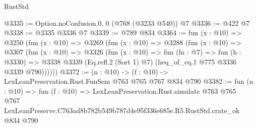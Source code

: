 \begin{lexlean}{RustStd}
\begin{coremodule}
@3335 := Option.noConfusion.{0, 0} (@768 (@3233 @540)) @7
@3336 := @422 @7
@3338 := @3335 @3336 @7
@3339 := @789 @834
@3364 := fun (x : @10) =>
  @3250
    (fun (x : @10) =>
    @3269
      (fun (x : @10) =>
      @3288
        (fun (x : @10) =>
        @3307
          (fun (x : @10) =>
          @3326
            (fun (x : @10) =>
            fun (fn : @7) =>
            fun (h : @3330) =>
            @3338 @3339 (Eq.refl.{2} (Sort 1) @7) (heq_of_eq.{1} @775 @3336 @3339 @790))))))
@3372 := (n : @10) -> (f : @10) -> LexLeanPreservation.Rust.FunSem @763 @765 @767 @834 @790
@3382 := fun (n : @10) =>
  fun (f : @10) =>
  LexLeanPreservation.Rust.simulate
    @763
    @765
    @767
    LexLeanPreserve.C763ad8b782b549b787d4e95f336e685e.R5.RustStd.crate_ok
    @834
    @790
\end{coremodule}
\end{lexlean}
